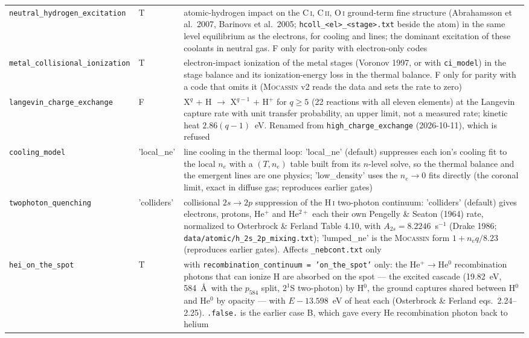 \documentclass[english,a4paper]{my_memo}
\newcommand{\code}[1]{\texttt{#1}}
\begin{document}
{\begin{longtable}{llp{7.2cm}}
\code{neutral\_hydrogen\_excitation} & T & atomic-hydrogen impact on the C\,\textsc{i}, C\,\textsc{ii}, O\,\textsc{i} ground-term fine structure (Abrahamsson et al.\ 2007, Barinovs et al.\ 2005; \code{hcoll\_<el>\_<stage>.txt} beside the atom) in the same level equilibrium as the electrons, for cooling and lines; the dominant excitation of these coolants in neutral gas.  F only for parity with electron-only codes \\
\code{metal\_collisional\_ionization} & T & electron-impact ionization of the metal stages (Voronov 1997, or with \code{ci\_model}) in the stage balance and its ionization-energy loss in the thermal balance.  F only for parity with a code that omits it (\textsc{Mocassin} v2 reads the data and sets the rate to zero) \\
\code{langevin\_charge\_exchange} & F & X$^q$ + H $\to$ X$^{q-1}$ + H$^+$ for $q \ge 5$ (22 reactions with all eleven elements) at the Langevin capture rate with unit transfer probability, an upper limit, not a measured rate; kinetic heat $2.86(q-1)$~eV.  Renamed from \code{high\_charge\_exchange} (2026-10-11), which is refused \\
\code{cooling\_model} & 'local\_ne' & line cooling in the thermal loop: 'local\_ne' (default) suppresses each ion's cooling fit to the local $n_e$ with a $(T, n_e)$ table built from its $n$-level solve, so the thermal balance and the emergent lines are one physics; 'low\_density' uses the $n_e\to0$ fits directly (the coronal limit, exact in diffuse gas; reproduces earlier gates) \\
\code{twophoton\_quenching} & 'colliders' & collisional $2s\to2p$ suppression of the H\,\textsc{i} two-photon continuum: 'colliders' (default) gives electrons, protons, He$^+$ and He$^{2+}$ each their own Pengelly \& Seaton (1964) rate, normalized to Osterbrock \& Ferland Table 4.10, with $A_{2s}=8.2246$~s$^{-1}$ (Drake 1986; \code{data/atomic/h\_2s\_2p\_mixing.txt}); 'lumped\_ne' is the \textsc{Mocassin} form $1+n_e q/8.23$ (reproduces earlier gates).  Affects \code{\_nebcont.txt} only \\
\code{hei\_on\_the\_spot} & T & with \code{recombination\_continuum = 'on\_the\_spot'} only: the He$^+\to$He$^0$ recombination photons that can ionize H are absorbed on the spot --- the excited cascade (19.82~eV, 584~\AA\ with the $p_{584}$ split, $2^1$S two-photon) by H$^0$, the ground captures shared between H$^0$ and He$^0$ by opacity --- with $E-13.598$~eV of heat each (Osterbrock \& Ferland eqs.~2.24--2.25).  \code{.false.} is the earlier case B, which gave every He recombination photon back to helium \\

\end{longtable}}
\end{document}
